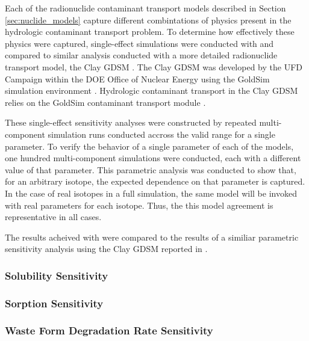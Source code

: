 
Each of the radionuclide contaminant transport models described in Section
\ref{sec:nuclide_models} capture different combintations of physics present in
the hydrologic contaminant transport problem. To determine how effectively
these physics were captured, single-effect simulations were conducted with
\Cyder and compared to similar analysis \cite{huff_key_2012} conducted with a
more detailed radionuclide transport model, the Clay \gls{GDSM}
\cite{clayton_generic_2011}. The Clay \gls{GDSM} was developed by the \gls{UFD}
Campaign within the \gls{DOE} Office of Nuclear Energy using the GoldSim
simulation environment \cite{golder_associates_goldsim_2010}. Hydrologic
contaminant transport in the Clay \gls{GDSM} relies on the GoldSim contaminant
transport module \cite{golder_associates_goldsim_2010-1}.

These single-effect sensitivity analyses were constructed by repeated
multi-component simulation runs conducted accross the valid range for a single
parameter. To verify the behavior of a single parameter of each of the \Cyder
models, one hundred multi-component simulations were conducted, each with a
different value of that parameter.  This parametric analysis was conducted to
show that, for an arbitrary isotope, the expected dependence on that parameter
is captured. In the case of real isotopes in a full simulation, the same model
will be invoked with real parameters for each isotope. Thus, the this model
agreement is representative in all cases.

The results acheived with \Cyder were compared to the results of a similiar
parametric sensitivity analysis using the Clay \gls{GDSM} reported in
\cite{huff_key_2012}.

\subsubsection{Solubility Sensitivity}

\FloatBarrier
\subsubsection{Sorption Sensitivity}

\FloatBarrier
\subsubsection{Waste Form Degradation Rate Sensitivity}

\FloatBarrier
